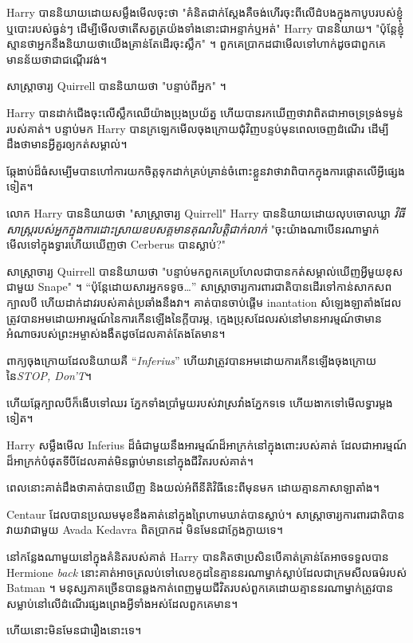 {Harry បាននិយាយដោយសម្លឹងមើលចុះថា "គំនិតជាក់ស្តែងគឺចង់ហើរចុះពីលើដំបងក្នុងកាបូបរបស់ខ្ញុំ ឬបោះរបស់ធ្ងន់ៗ ដើម្បីមើលថាតើសត្វត្រយ៉ងទាំងនោះជាអន្ទាក់ឬអត់" Harry បាននិយាយ។ "ប៉ុន្តែខ្ញុំស្មានថាអ្នកនឹងនិយាយថាយើងគ្រាន់តែដើរចុះស្លឹក" ។ ពួកគេប្រាកដជាមើលទៅហាក់ដូចជាពួកគេមានន័យថាជាជណ្តើរវង់។

សាស្រ្តាចារ្យ Quirrell បាននិយាយថា "បន្ទាប់ពីអ្នក" ។

Harry បាន​ដាក់​ជើង​ចុះ​លើ​ស្លឹក​ឈើ​យ៉ាង​ប្រុងប្រយ័ត្ន ហើយ​បាន​រក​ឃើញ​ថា​វា​ពិត​ជា​អាច​ទ្រទ្រង់​ទម្ងន់​របស់​គាត់។ បន្ទាប់មក Harry បានក្រឡេកមើលចុងក្រោយជុំវិញបន្ទប់មុនពេលចេញដំណើរ ដើម្បីដឹងថាមានអ្វីគួរឲ្យកត់សម្គាល់។

ឆ្កែងាប់ដ៏ធំសម្បើមបានហៅការយកចិត្តទុកដាក់គ្រប់គ្រាន់ចំពោះខ្លួនវាថាវាពិបាកក្នុងការផ្តោតលើអ្វីផ្សេងទៀត។

លោក Harry បាននិយាយថា "សាស្រ្តាចារ្យ Quirrell" Harry បាននិយាយដោយលុបចោលឃ្លា \emph{វិធីសាស្រ្តរបស់អ្នកក្នុងការដោះស្រាយឧបសគ្គមានគុណវិបត្តិជាក់លាក់} "ចុះយ៉ាងណាបើនរណាម្នាក់មើលទៅក្នុងទ្វារហើយឃើញថា Cerberus បានស្លាប់?"

សាស្រ្តាចារ្យ Quirrell បាននិយាយថា "បន្ទាប់មកពួកគេប្រហែលជាបានកត់សម្គាល់ឃើញអ្វីមួយខុសជាមួយ Snape" ។ “ប៉ុន្តែដោយសារអ្នកទទូច…” សាស្ត្រាចារ្យការពារជាតិបានដើរទៅកាន់សាកសពក្បាលបី ហើយដាក់ដាវរបស់គាត់ប្រឆាំងនឹងវា។ គាត់បានចាប់ផ្តើម inantation សំឡេងឡាតាំងដែលត្រូវបានអមដោយអារម្មណ៍នៃការកើនឡើងនៃក្តីបារម្ភ, ក្មេងប្រុសដែលរស់នៅមានអារម្មណ៍ថាមានអំណាចរបស់ព្រះអម្ចាស់ងងឹតដូចដែលគាត់តែងតែមាន។

ពាក្យចុងក្រោយដែលនិយាយគឺ “\emph{Inferius}” ហើយវាត្រូវបានអមដោយការកើនឡើងចុងក្រោយនៃ\emph{STOP, Don'T}។

ហើយ​ឆ្កែ​ក្បាល​បី​ក៏​ងើប​ទៅ​ឈរ ភ្នែក​ទាំង​ប្រាំ​មួយ​របស់​វា​ស្រវាំង​ភ្នែក​ទទេ ហើយ​ងាក​ទៅ​មើល​ទ្វារ​ម្ដង​ទៀត។

Harry សម្លឹងមើល Inferius ដ៏ធំជាមួយនឹងអារម្មណ៍ដ៏អាក្រក់នៅក្នុងពោះរបស់គាត់ ដែលជាអារម្មណ៍ដ៏អាក្រក់បំផុតទីបីដែលគាត់មិនធ្លាប់មាននៅក្នុងជីវិតរបស់គាត់។

ពេលនោះគាត់ដឹងថាគាត់បានឃើញ និងយល់អំពីនីតិវិធីនេះពីមុនមក ដោយគ្មានភាសាឡាតាំង។

Centaur ដែលបានប្រឈមមុខនឹងគាត់នៅក្នុងព្រៃហាមឃាត់បានស្លាប់។ សាស្ត្រាចារ្យការពារជាតិបានវាយវាជាមួយ Avada Kedavra ពិតប្រាកដ មិនមែនជាក្លែងក្លាយទេ។

នៅកន្លែងណាមួយនៅក្នុងគំនិតរបស់គាត់ Harry បានគិតថាប្រសិនបើគាត់គ្រាន់តែអាចទទួលបាន Hermione \emph{back} នោះគាត់អាចត្រលប់ទៅលេខកូដនៃគ្មាននរណាម្នាក់ស្លាប់ដែលជាក្រមសីលធម៌របស់ Batman ។ មនុស្សភាគច្រើនបានឆ្លងកាត់ពេញមួយជីវិតរបស់ពួកគេដោយគ្មាននរណាម្នាក់ត្រូវបានសម្លាប់នៅលើដំណើរផ្សងព្រេងអ្វីទាំងអស់ដែលពួកគេមាន។

ហើយនោះមិនមែនជារឿងនោះទេ។

}
